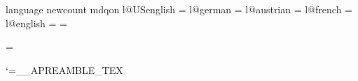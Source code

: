 \fi
\ifabfull

\gdef\abetc@german{

\def\abphrase##1{%
\ifcase##1{ und }\or{}\or{ und andere}\or{ (Herausgeber)}\or{ (Herausgeber)}\or%
{ aus }\or{ in }\or{In }\or{Band}\or{Band}\or{Nummer}\or{Nummer}\or%
{ Auf{\kern0pt}lage}\or{Seiten}\or{Seite}\or{Kapitel}\or%
{Bericht}\or{Diplomarbeit}\or{Dissertation}\fi}

\def\abmonth##1{\ifcase##1\or Januar\or Februar\or M\"arz\or April\or Mai\or
  Juni\or Juli\or August\or September\or Oktober\or November\or Dezember\fi}

\def\abedition##1{\ifcase##1\or Erste\or Zweite\or Dritte\or Vierte\or F\"unf\-te\or
  Sechste\or Siebte\or Achte\or Neunte\or Zehnte\else?\fi}

\def\abchapter##1{\ifcase##1Abschnitt\or Absatz\or Anhang\or Teil\fi}

}

\else

\gdef\abetc@german{

\def\abphrase##1{%
\ifcase##1{ und }\or{}\or{ u.\thinspace a.}\or{ (Hrsg.)}\or{ (Hrsg.)}\or%
{ aus }\or{ in }\or{In }\or{Bd.}\or{Bd.}\or{Nr.}\or{Nr.}\or%
{ Aufl.}\or{S.}\or{S.}\or{Kap.}\or%
{Bericht}\or{Diplomarbeit}\or{Dissertation}\fi}

\def\abmonth##1{\ifcase##1\or Jan.\or Feb.\or M\"arz\or Apr.\or Mai\or
  Juni\or Juli\or Aug.\or Sep.\or Okt.\or Nov.\or Dez.\fi}

\def\abedition##1{\ifcase##1\or 1.\or 2.\or 3.\or 4.\or 5.\or
  6.\or 7.\or 8.\or 9.\or 10.\else?\fi}

\def\abchapter##1{\ifcase##1Abschn.\or Abs.\or Anh.\or Teil\fi}

}

\fi
\expandafter\ifx\csname language\endcsname\relax %
  \csname newcount\endcsname\language
\fi
\expandafter\ifx\csname mdqon\endcsname\relax %
  \chardef{}
  \chardef{}
  \chardef{}
  \chardef{}
  \chardef{}
  \language\USenglish
\else
  \expandafter\ifx\csname l@USenglish\endcsname\relax \else
    \chardef\USenglish=\l@USenglish\fi
  \expandafter\ifx\csname l@german\endcsname\relax \else
    \chardef\german=\l@german\fi
  \expandafter\ifx\csname l@austrian\endcsname\relax \else
    \chardef\austrian=\l@austrian\fi
  \expandafter\ifx\csname l@french\endcsname\relax \else
    \chardef\french=\l@french\fi
  \expandafter\ifx\csname l@english\endcsname\relax \else
    \chardef\english=\l@english\fi
\fi
\ifnum\language=\german
  \abtype@german \abetc@german
\else\ifnum\language=\austrian
  \abtype@german \abetc@german
\else
  \abtype@english \abetc@english
\fi\fi
\catcode`\@=\csname__APREAMBLE_TEX\endcsname
\endinput
